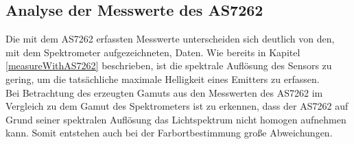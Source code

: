 \documentclass[11pt]{scrartcl}
\begin{document}
\subsection{Analyse der Messwerte des AS7262} \label{measuresWithAS7262}
Die mit dem AS7262 erfassten Messwerte unterscheiden sich deutlich von den, mit dem Spektrometer aufgezeichneten, Daten. Wie bereits
in Kapitel \ref{measureWithAS7262} beschrieben, ist die spektrale Auflösung des Sensors zu gering, um die tatsächliche maximale
Helligkeit eines Emitters zu erfassen.\\
Bei Betrachtung des erzeugten Gamuts aus den Messwerten des AS7262 im Vergleich zu dem Gamut des Spektrometers ist zu erkennen, dass
der AS7262 auf Grund seiner spektralen Auflösung das Lichtspektrum nicht homogen aufnehmen kann. Somit entstehen auch bei der
Farbortbestimmung große Abweichungen.
\end{document}
